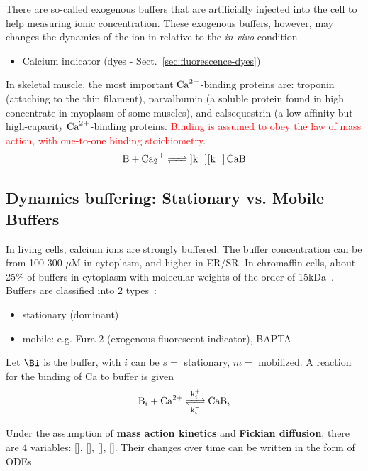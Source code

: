 There are so-called exogenous buffers that are artificially injected into the
cell to help measuring ionic concentration. These exogenous buffers, however,
may changes the dynamics of the ion in relative to the {\it in vivo} condition.
\begin{itemize}
    \item Calcium indicator (dyes - Sect.~\ref{sec:fluorescence-dyes})
\end{itemize}

In skeletal muscle, the most important ${\text{Ca}^{2+}}$-binding proteins are:
troponin (attaching to the thin filament), parvalbumin (a soluble
protein found in high concentrate in myoplasm of some muscles), and
calsequestrin (a low-affinity but high-capacity ${\text{Ca}^{2+}}$-binding proteins.
\textcolor{red}{Binding is assumed to obey the law of mass action,
  with one-to-one binding stoichiometry}. 
\begin{equation}
\ce{B + Ca2+ <=>]k^+][k^-] CaB}
\end{equation}
 
\subsection{Dynamics buffering: Stationary vs. Mobile Buffers}
\label{sec:dynamics-buffering}
In living cells, calcium ions are strongly buffered.
The buffer concentration can be from 100-300 $\mu$M in cytoplasm, and higher in
ER/SR.  In chromaffin cells, about 25\% of buffers in cytoplasm with molecular
weights of the order of 15kDa~\citep{zhou1993}. Buffers are classified into 2
types~\citep{wagner1994erb}:
\begin{itemize}
\item stationary (dominant)
\item mobile: e.g. Fura-2 (exogenous fluorescent indicator), BAPTA
\end{itemize}

Let $\Bi$ is the buffer, with $i$ can be $s=$ stationary, $m=$
mobilized. A reaction for the binding of Ca to buffer is given
\begin{equation}
  \label{eq:933}
  \ce{B_i + Ca^2+ <=>[k^+_i][k^-_i] CaB_i}
\end{equation}


Under the assumption of {\bf mass action kinetics} and {\bf Fickian diffusion},
there are 4 variables: [], [], [],
[]. Their changes over time can be written in the form of ODEs


